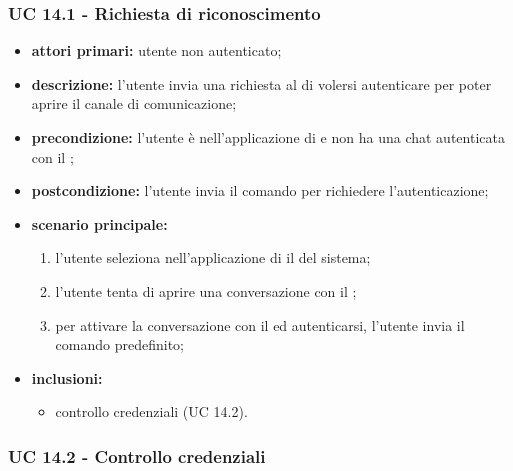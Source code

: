 	\subsubsection{UC 14.1 - Richiesta di riconoscimento}

	\begin{itemize}
		\item \textbf{attori primari:} utente non autenticato;
		\item \textbf{descrizione:} l'utente invia una richiesta al  di volersi autenticare per poter aprire il canale di comunicazione;
		\item \textbf{precondizione:} l'utente è nell'applicazione di  e non ha una chat autenticata con il ;
		\item \textbf{postcondizione:} l'utente invia il comando per richiedere l'autenticazione;
		\item \textbf{scenario principale:}
		\begin{enumerate}
			\item l'utente seleziona nell'applicazione di  il  del sistema;
			\item l'utente tenta di aprire una conversazione con il ;
			\item per attivare la conversazione con il  ed autenticarsi, l'utente invia il comando predefinito;
		\end{enumerate}
		\item \textbf{inclusioni:}
		\begin{itemize}
			\item controllo credenziali (UC 14.2).
		\end{itemize}
	\end{itemize}

	\subsubsection{UC 14.2 - Controllo credenziali}

